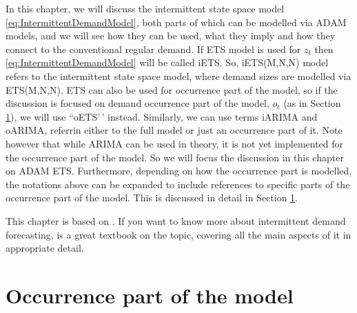 \documentclass[
]{book}
\theoremstyle{definition}
\theoremstyle{definition}
\theoremstyle{definition}
\theoremstyle{definition}
\theoremstyle{remark}
\begin{document}
In this chapter, we will discuss the intermittent state space model \eqref{eq:IntermittentDemandModel}, both parts of which can be modelled via ADAM models, and we will see how they can be used, what they imply and how they connect to the conventional regular demand. If ETS model is used for \(z_t\) then \eqref{eq:IntermittentDemandModel} will be called iETS. So, iETS(M,N,N) model refers to the intermittent state space model, where demand sizes are modelled via ETS(M,N,N). ETS can also be used for occurrence part of the model, so if the discussion is focused on demand occurrence part of the model, \(o_t\) (as in Section \ref{ADAMOccurrence}), we will use ``oETS'\,' instead. Similarly, we can use terms iARIMA and oARIMA, referrin either to the full model or just an occurrence part of it. Note however that while ARIMA can be used in theory, it is not yet implemented for the occurrence part of the model. So we will focus the discussion in this chapter on ADAM ETS. Furthermore, depending on how the occurrence part is modelled, the notations above can be expanded to include references to specific parts of the occurrence part of the model. This is discussed in detail in Section \ref{ADAMOccurrence}.

This chapter is based on \citet{Svetunkov2019a}. If you want to know more about intermittent demand forecasting, \citet{BoylanSyntetos2021} is a great textbook on the topic, covering all the main aspects of it in appropriate detail.

\hypertarget{ADAMOccurrence}{%
\section{Occurrence part of the model}\label{ADAMOccurrence}}
\end{document}
